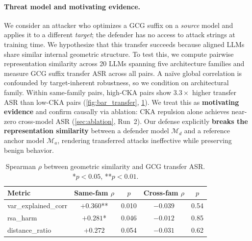 \paragraph{Threat model and motivating evidence.}
We consider an attacker who optimizes a GCG suffix on a \emph{source} model and applies it to a different \emph{target}; the defender has no access to attack strings at training time. We hypothesize that this transfer succeeds because aligned LLMs share similar internal geometric structure. To test this, we compute pairwise representation similarity across 20 LLMs spanning five architecture families and measure GCG suffix transfer ASR across all pairs. A na\"ive global correlation is confounded by target-inherent robustness, so we condition on architectural family. Within same-family pairs, high-CKA pairs show $3.3\times$ higher transfer ASR than low-CKA pairs (\cref{fig:bar_transfer}, \cref{tab:family_corr}). We treat this as \textbf{motivating evidence} and confirm causally via ablation: CKA repulsion alone achieves near-zero cross-model ASR (\cref{sec:ablation}, Run~2). Our defense explicitly \textbf{breaks the representation similarity} between a defender model $\mathcal{M}_d$ and a reference anchor model $\mathcal{M}_a$, rendering transferred attacks ineffective while preserving benign behavior.



\begin{table}[t]
\centering
\caption{Spearman $\rho$ between geometric similarity and GCG transfer ASR. {*}$p<0.05$, {**}$p<0.01$.}
\label{tab:family_corr}
\begin{tabular}{lcccc}
\toprule
Metric & Same-fam $\rho$ & $p$ & Cross-fam $\rho$ & $p$ \\
\midrule
var\_explained\_corr & $+0.360$** & 0.010 & $-0.039$ & 0.54 \\
rsa\_harm            & $+0.281$*  & 0.046 & $-0.012$ & 0.85 \\
distance\_ratio      & $+0.272$   & 0.054 & $-0.031$ & 0.62 \\
\bottomrule
\end{tabular}
\end{table}
